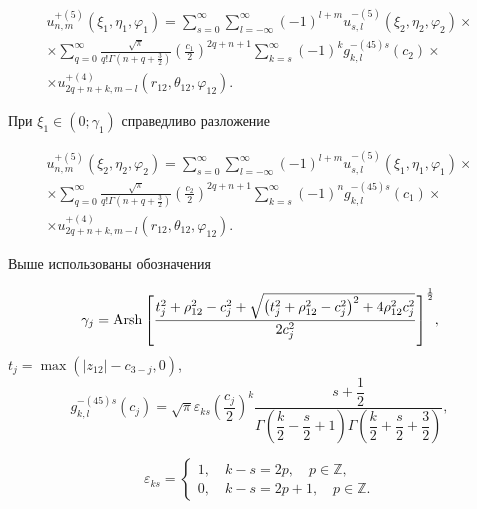 \begin{russian}
\begin{theorem}
\begin{multline}\label{eq:1:22}
u_{n,m}^{ + (5)}\left( {{\xi _1},{\eta _1},{\varphi _1}} \right) = \sum\limits_{s = 0}^\infty  {\sum\limits_{l =  - \infty }^\infty  {{{( - 1)}^{l + m}}} } u_{s,l}^{ - (5)}\left( {{\xi _2},{\eta _2},{\varphi _2}} \right) \times \\
\times \sum\limits_{q = 0}^\infty  {\frac{{\sqrt \pi  }}{{q!\Gamma \left( {n + q + \frac{3}{2}} \right)}}} {\left( {\frac{{{c_1}}}{2}} \right)^{2q + n + 1}}\sum\limits_{k = s}^\infty  {{{( - 1)}^k}} g_{k,l}^{ - (45)s}({c_2}) \times \\
\times u_{2q + n + k,m - l}^{ + (4)}\left( {{r_{12}},{\theta _{12}},{\varphi _{12}}} \right).
\end{multline}

При ${\xi _1} \in \left( {0;{\gamma _1}} \right)$ справедливо разложение

\begin{multline}\label{eq:1:23}
u_{n,m}^{ + (5)}\left( {{\xi _2},{\eta _2},{\varphi _2}} \right) = \sum\limits_{s = 0}^\infty  {\sum\limits_{l =  - \infty }^\infty  {{{( - 1)}^{l + m}}} } u_{s,l}^{ - (5)}\left( {{\xi _1},{\eta _1},{\varphi _1}} \right) \times \\
\times \sum\limits_{q = 0}^\infty  {\frac{{\sqrt \pi  }}{{q!\Gamma \left( {n + q + \frac{3}{2}} \right)}}} {\left( {\frac{{{c_2}}}{2}} \right)^{2q + n + 1}}\sum\limits_{k = s}^\infty  {{{( - 1)}^n}} g_{k,l}^{ - (45)s}({c_1}) \times \\
\times u_{2q + n + k,m - l}^{ + (4)}\left( {{r_{12}},{\theta _{12}},{\varphi _{12}}} \right).
\end{multline}

Выше использованы обозначения

\begin{equation}\label{eq:1:24}
{\gamma _j} = {\rm{Arsh}}{\mkern 1mu} {\kern 1pt} {\left[ {\frac{{t^2_j + \rho _{12}^2 - c_j^2 + \sqrt {\left( {t^2_j + \rho _{12}^2 - c_j^2} \right)^2 + 4\rho _{12}^2c_j^2} }}{{2c_j^2}}} \right]^{\frac{1}{2}}},
\end{equation}
$t_j=\max(|z_{12}|-c_{3-j},0)$,
\begin{equation}\label{eq:1:25}
g_{k,l}^{ - (45)s}({c_j}) = \sqrt \pi  {\varepsilon _{ks}}{\left( {\dfrac{{{c_j}}}{2}} \right)^k}\dfrac{{s + \dfrac{1}{2}}}{{\Gamma \left( {\dfrac{k}{2} - \dfrac{s}{2} + 1} \right)\Gamma \left( {\dfrac{k}{2} + \dfrac{s}{2} + \dfrac{3}{2}} \right)}},
\end{equation}

\begin{equation}\label{eq:1:26}
\varepsilon_{ks}=\left\{ {\begin{array}{*{20}{l}}
{1,\quad k - s = 2p,\quad p \in \mathbb{Z},}\\
{0,\quad k - s = 2p + 1,\quad p \in \mathbb{Z}.}
\end{array}} \right.
\end{equation}


\end{theorem}
\end{russian}
